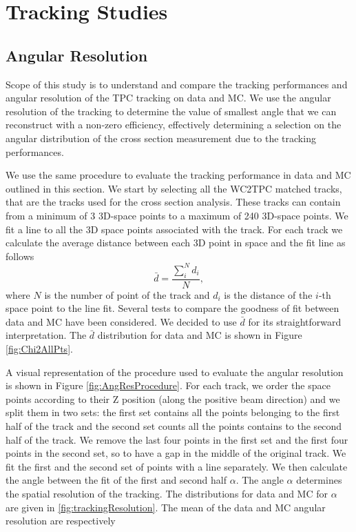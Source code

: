 

\section{Tracking Studies}
\subsection{Angular Resolution}
Scope of this study is to understand and compare the tracking performances and angular resolution of the TPC tracking on data and MC. 
We use the angular resolution of the tracking to determine  the value of smallest angle that we can reconstruct with a non-zero efficiency, effectively determining a selection on the angular distribution of the cross section measurement due to the tracking performances.


We use the same procedure to evaluate the tracking performance in data and MC  outlined in this section. 
We start by selecting all the WC2TPC matched tracks, that are the tracks used for the cross section analysis.  These tracks can contain from a minimum of 3 3D-space points to a maximum of 240  3D-space points.  We fit a line to all the 3D space points associated with the track. 
For each track we calculate the average distance between each 3D point in space and the fit line as follows 
\begin{equation} 
\bar d = \frac{\sum^N_i d_i}{N},
\end{equation} 
where $N$ is the number of point of the track and $d_i$ is the distance of the $i$-th space point to the line fit. Several tests to compare the goodness of fit between data and MC have been considered. We decided to use $\bar d$ for its straightforward interpretation. The $\bar d$ distribution for data and MC is shown in Figure \ref{fig:Chi2AllPts}.

A visual representation of the procedure used to evaluate the angular resolution is shown in Figure \ref{fig:AngResProcedure}. 
For each track, we order the space points according to their Z position (along the positive beam direction) and we split them in two sets: the first set contains all the points belonging to the first half of the track and the second set counts all the points contains to the second half of the track. We remove the last four points in the first set and the first four points in the second set, so to have a gap in the middle of the original track. We fit the first and the second set of points with a line separately. We then calculate the angle between the fit of the first and second half $\alpha$. The angle $\alpha$ determines the spatial resolution of the tracking. The distributions for data and MC for $\alpha$ are given in \ref{fig:trackingResolution}. The mean of the data and MC angular resolution are respectively 

